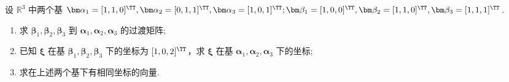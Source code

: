 	\begin{titwo}
		设 $\mathbb{R}^{3}$ 中两个基 $\bm \alpha_{1} = [1,1,0]^{\TT}, \bm \alpha_{2} = [0,1,1]^{\TT}, \bm \alpha_{3} = [1,0,1]^{\TT}; \bm \beta_{1} = [1,0,0]^{\TT}, \bm \beta_{2} = [1,1,0]^{\TT}, \bm \beta_{3} = [1,1,1]^{\TT}$.
		\begin{enumerate}
			\item 求 $\bm \beta_{1},\bm \beta_{2},\bm \beta_{3}$ 到 $\bm \alpha_{1},\bm \alpha_{2},\bm \alpha_{3}$ 的过渡矩阵;
			\item 已知 $\bm \xi$ 在基 $\bm \beta_{1},\bm \beta_{2},\bm \beta_{3}$ 下的坐标为 $[1,0,2]^{\TT}$，求 $\bm \xi$ 在基 $\bm \alpha_{1},\bm \alpha_{2},\bm \alpha_{3}$ 下的坐标;
			\item 求在上述两个基下有相同坐标的向量.
		\end{enumerate}
	\end{titwo}